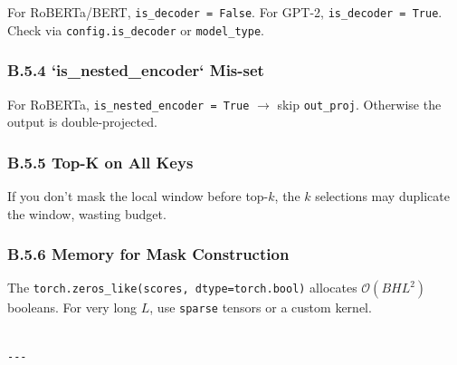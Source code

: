 For RoBERTa/BERT, \texttt{is\_decoder = False}. For GPT-2, \texttt{is\_decoder = True}. 
Check via \texttt{config.is\_decoder} or \texttt{model\_type}.

\subsubsection{B.5.4 `is\_nested\_encoder` Mis-set}

For RoBERTa, \texttt{is\_nested\_encoder = True} $\to$ skip \texttt{out\_proj}. Otherwise the 
output is double-projected.

\subsubsection{B.5.5 Top-K on All Keys}

If you don't mask the local window before top-$k$, the $k$ selections may 
duplicate the window, wasting budget.

\subsubsection{B.5.6 Memory for Mask Construction}

The \texttt{torch.zeros\_like(scores, dtype=torch.bool)} allocates 
$\mathcal{O}(B H L^2)$ booleans. For very long $L$, use \texttt{sparse} tensors 
or a custom kernel.
\begin{lstlisting}

---
\end{lstlisting}